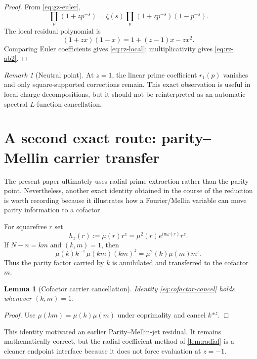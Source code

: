 \documentclass[11pt]{article}
\newtheorem{lemma}[theorem]{Lemma}
\theoremstyle{definition}
\theoremstyle{remark}
\newtheorem{remark}[theorem]{Remark}
\newcommand{\1}{\mathbf 1}
\begin{document}
\begin{proof}
From \eqref{eq:gz-euler},
\[
\prod_p(1+zp^{-s})
=
\zeta(s)
\prod_p(1+zp^{-s})(1-p^{-s}).
\]
The local residual polynomial is
\[
(1+zx)(1-x)=1+(z-1)x-zx^2.
\]
Comparing Euler coefficients gives \eqref{eq:rz-local}; multiplicativity gives \eqref{eq:rz-ab2}.
\end{proof}

\begin{remark}[Neutral point]
At $z=1$, the linear prime coefficient $r_1(p)$ vanishes and only square-supported corrections remain.  This exact observation is useful in local charge decompositions, but it should not be reinterpreted as an automatic spectral $L$-function cancellation.
\end{remark}

\section{A second exact route: parity--Mellin carrier transfer}

The present paper ultimately uses radial prime extraction rather than the parity point.  Nevertheless, another exact identity obtained in the course of the reduction is worth recording because it illustrates how a Fourier/Mellin variable can move parity information to a cofactor.

For squarefree $r$ set
\begin{equation}\label{eq:parity-mellin-mode}
h_z(r):=\mu(r)r^z=\mu^2(r)e^{i\pi\omega(r)}r^z.
\end{equation}
If $N-n=km$ and $(k,m)=1$, then
\begin{equation}\label{eq:cofactor-cancel}
\mu(k)k^{-z}\,\mu(km)(km)^z
=
\mu^2(k)\mu(m)m^z.
\end{equation}
Thus the parity factor carried by $k$ is annihilated and transferred to the cofactor $m$.

\begin{lemma}[Cofactor carrier cancellation]\label{lem:cofactor}
Identity \eqref{eq:cofactor-cancel} holds whenever $(k,m)=1$.
\end{lemma}

\begin{proof}
Use $\mu(km)=\mu(k)\mu(m)$ under coprimality and cancel $k^{\pm z}$.
\end{proof}

This identity motivated an earlier Parity--Mellin-jet residual.  It remains mathematically correct, but the radial coefficient method of \cref{lem:radial} is a cleaner endpoint interface because it does not force evaluation at $z=-1$.
\end{document}
